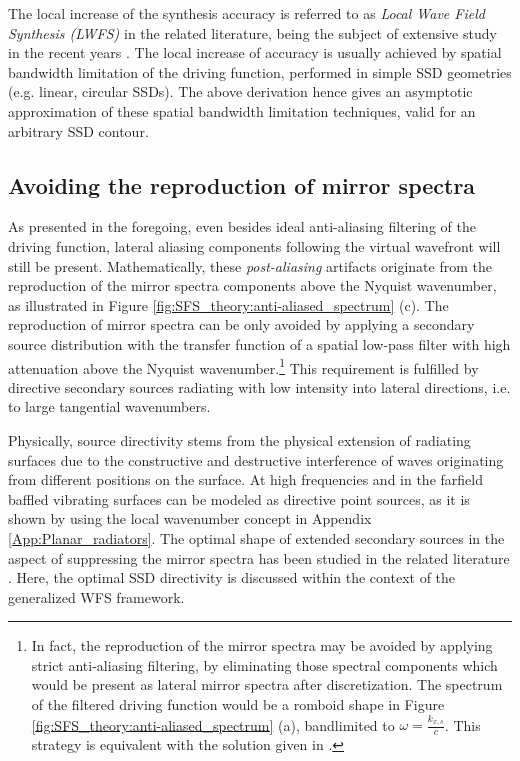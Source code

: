 The local increase of the synthesis accuracy is referred to as \emph{Local Wave Field Synthesis (LWFS)} in the related literature, being the subject of extensive study in the recent years \cite{ahrens2010local, 5946329, spors2011local, Winter15:EURONOISE, Winter15:AES, Hahn17:EUSIPCO, Hahn16:AES, Winter2016-TASL}.
The local increase of accuracy is usually achieved by spatial bandwidth limitation of the driving function, performed in simple SSD geometries (e.g. linear, circular SSDs).
The above derivation hence gives an asymptotic approximation of these spatial bandwidth limitation techniques, valid for an arbitrary SSD contour.

\subsection{Avoiding the reproduction of mirror spectra}

As presented in the foregoing, even besides ideal anti-aliasing filtering of the driving function, lateral aliasing components following the virtual wavefront will still be present.
Mathematically, these \emph{post-aliasing} artifacts originate from the reproduction of the mirror spectra components above the Nyquist wavenumber, as illustrated in Figure \ref{fig:SFS_theory:anti-aliased_spectrum} (c).
The reproduction of mirror spectra can be only avoided by applying a secondary source distribution with the transfer function of a spatial low-pass filter with high attenuation above the Nyquist wavenumber.\footnote{In fact, the reproduction of the mirror spectra may be avoided by applying strict anti-aliasing filtering, by eliminating those spectral components which would be present as lateral mirror spectra after discretization. 
The spectrum of the filtered driving function would be a romboid shape in Figure \ref{fig:SFS_theory:anti-aliased_spectrum} (a), bandlimited to $\omega = \frac{k_{x,s}}{c}$.
This strategy is equivalent with the solution given in \cite{Winter2018:GeometricModel}.}
This requirement is fulfilled by directive secondary sources radiating with low intensity into lateral directions, i.e. to large tangential wavenumbers.

Physically, source directivity stems from the physical extension of radiating surfaces due to the constructive and destructive interference of waves originating from different positions on the surface.
At high frequencies and in the farfield baffled vibrating surfaces can be modeled as directive point sources, as it is shown by using the local wavenumber concept in Appendix \ref{App:Planar_radiators}.
The optimal shape of extended secondary sources in the aspect of suppressing the mirror spectra has been studied in the related literature \cite{Verheijen1997:phd}.
Here, the optimal SSD directivity is discussed within the context of the generalized WFS framework.

